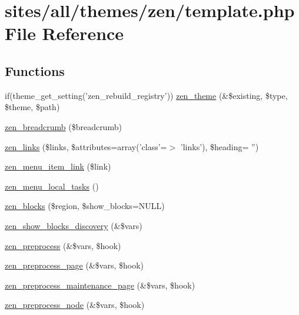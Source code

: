 \hypertarget{sites_2all_2themes_2zen_2template_8php}{
\section{sites/all/themes/zen/template.php File Reference}
\label{sites_2all_2themes_2zen_2template_8php}
}
\subsection*{Functions}
\begin{CompactItemize}
\item 
if(theme\_\-get\_\-setting('zen\_\-rebuild\_\-registry')) \hyperlink{sites_2all_2themes_2zen_2template_8php_aedb086736f6fb568846dddaaa420ba0}{zen\_\-theme} (\&\$existing, \$type, \$theme, \$path)
\item 
\hyperlink{sites_2all_2themes_2zen_2template_8php_52d978469f9a39a0a2c89585f81cf5cd}{zen\_\-breadcrumb} (\$breadcrumb)
\item 
\hyperlink{sites_2all_2themes_2zen_2template_8php_acdeb97b225d8fd386a9bded28eb762c}{zen\_\-links} (\$links, \$attributes=array('class'=$>$ 'links'), \$heading= '')
\item 
\hyperlink{sites_2all_2themes_2zen_2template_8php_5cc3de9913eef914e51aff3c972c2e70}{zen\_\-menu\_\-item\_\-link} (\$link)
\item 
\hyperlink{sites_2all_2themes_2zen_2template_8php_5a939997bd1b280d7d3829e0576f2a5a}{zen\_\-menu\_\-local\_\-tasks} ()
\item 
\hyperlink{sites_2all_2themes_2zen_2template_8php_5d93a4bc56049bf6962fa956bc54d274}{zen\_\-blocks} (\$region, \$show\_\-blocks=NULL)
\item 
\hyperlink{sites_2all_2themes_2zen_2template_8php_73caa65f5d569efce36a732c0775f3e6}{zen\_\-show\_\-blocks\_\-discovery} (\&\$vars)
\item 
\hyperlink{sites_2all_2themes_2zen_2template_8php_34cb06c8098f8e1c710c501bb9a64d8b}{zen\_\-preprocess} (\&\$vars, \$hook)
\item 
\hyperlink{sites_2all_2themes_2zen_2template_8php_cf0810eb7d08edfccf3a1d5272348220}{zen\_\-preprocess\_\-page} (\&\$vars, \$hook)
\item 
\hyperlink{sites_2all_2themes_2zen_2template_8php_b10127f1877ff315fa0dc19019c9cd77}{zen\_\-preprocess\_\-maintenance\_\-page} (\&\$vars, \$hook)
\item 
\hyperlink{sites_2all_2themes_2zen_2template_8php_e04e9c17a2287b871b2d29ec76cd4214}{zen\_\-preprocess\_\-node} (\&\$vars, \$hook)

\end{CompactItemize}
